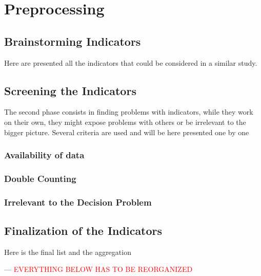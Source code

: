\section{Preprocessing}
\subsection{Brainstorming Indicators}
Here are presented all the indicators that could be considered in a similar study.

\subsection{Screening the Indicators}
The second phase consists in finding problems with indicators, while they work on their own, they might expose problems with others or be irrelevant to the bigger picture. Several criteria are used and will be here presented one by one

\subsubsection{Availability of data}

\subsubsection{Double Counting}

\subsubsection{Irrelevant to the Decision Problem}

\subsection{Finalization of the Indicators}
Here is the final list and the aggregation

---
\textcolor{red}{EVERYTHING BELOW HAS TO BE REORGANIZED}


